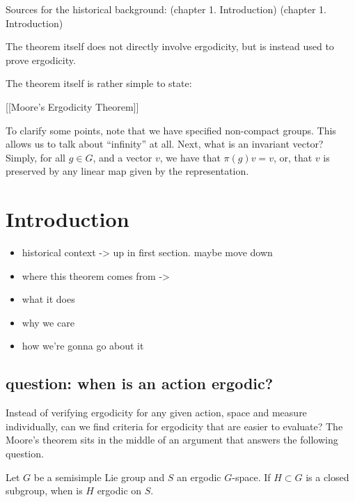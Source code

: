 \documentclass[
]{article}
\begin{document}
Sources for the historical background: \cite{mackey74}(chapter 1.
Introduction) \cite{Zimmer84}(chapter 1. Introduction)

The theorem itself does not directly involve ergodicity, but is instead
used to prove ergodicity.

The theorem itself is rather simple to state:

{[}{[}Moore's Ergodicity Theorem{]}{]}

To clarify some points, note that we have specified non-compact groups.
This allows us to talk about ``infinity'' at all. Next, what is an
invariant vector? Simply, for all \(g\in G\), and a vector \(v\), we
have that \(\pi(g)v = v\), or, that \(v\) is preserved by any linear map
given by the representation.






\hypertarget{introduction}{%
\section{Introduction}\label{introduction}}


\begin{itemize}
  \item historical context -\textgreater{} up in first section. maybe move down
  \item where this theorem comes from -\textgreater{} \cite{howe79}
  \item what it does
  \item why we care
  \item how we're gonna go about it
\end{itemize}

\hypertarget{question-when-is-an-action-ergodic}{%
\subsection{question: when is an action
ergodic?}\label{question-when-is-an-action-ergodic}}

Instead of verifying ergodicity for any given action, space and measure
individually, can we find criteria for ergodicity that are easier to
evaluate? The Moore's theorem sits in the middle of an argument that
answers the following question.

Let \(G\) be a semisimple Lie group and \(S\) an ergodic \(G\)-space. If
\(H\subset G\) is a closed subgroup, when is \(H\) ergodic on \(S\).
\end{document}
